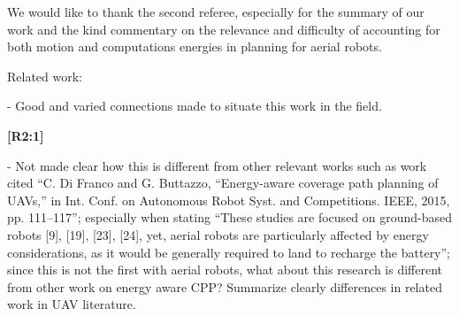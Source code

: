\documentclass[10pt]{letter}
\begin{document}
{\color{blue} 


{\hspace*{-4.5em}{[R2]}\vspace*{-1.9em}}

We would like to thank the second referee, especially for the summary of our work and the kind commentary on the relevance and difficulty of accounting for both motion and computations energies in planning for aerial robots. %


}

\vspace{2em}

Related work:

- Good and varied connections made to situate this work in the field. 

{\hspace*{-4.5em}\textbf{[R2:1]}\vspace*{-1.9em}}

- Not made clear how this is different from other relevant works such as work cited ``C. Di Franco and G. Buttazzo, ``Energy-aware coverage path planning of UAVs,'' in Int. Conf. on Autonomous Robot Syst. and Competitions. IEEE, 2015, pp. 111–117''; especially when stating ``These studies are focused on ground-based robots [9], [19], [23], [24], yet, aerial robots are particularly affected by energy considerations, as it would be generally required to land to recharge the battery''; since this is not the first with aerial robots, what about this research is different from other work on energy aware CPP? Summarize clearly differences in related work in UAV literature.
\end{document}
